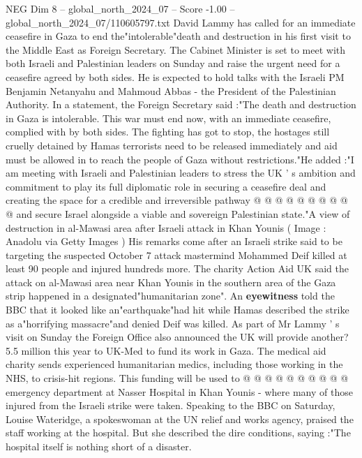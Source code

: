 \begin{textsample}{NEG Dim 8 – global\_north\_2024\_07 – Score -1.00 – global\_north\_2024\_07/110605797.txt}  \label{ex:f8_neg_409}
David Lammy has called for an immediate ceasefire in Gaza to end the"intolerable"death and destruction in his first visit to the Middle East as Foreign Secretary.
The Cabinet Minister is set to meet with both Israeli and Palestinian leaders on Sunday and raise the urgent need for a ceasefire agreed by both sides.
He is expected to hold talks with the Israeli PM Benjamin Netanyahu and Mahmoud Abbas - the President of the Palestinian Authority.
In a statement, the Foreign Secretary said :"The death and destruction in Gaza is intolerable.
This war must end now, with an immediate ceasefire, complied with by both sides.
The fighting has got to stop, the hostages still cruelly detained by Hamas terrorists need to be released immediately and aid must be allowed in to reach the people of Gaza without restrictions."He added :"I am meeting with Israeli and Palestinian leaders to stress the UK ' s ambition and commitment to play its full diplomatic role in securing a ceasefire deal and creating the space for a credible and irreversible pathway @ @ @ @ @ @ @ @ @ @ and secure Israel alongside a viable and sovereign Palestinian state."A view of destruction in al-Mawasi area after Israeli attack in Khan Younis ( Image : Anadolu via Getty Images ) His remarks come after an Israeli strike said to be targeting the suspected October 7 attack mastermind Mohammed Deif killed at least 90 people and injured hundreds more.
The charity Action Aid UK said the attack on al-Mawasi area near Khan Younis in the southern area of the Gaza strip happened in a designated"humanitarian zone".
An \textbf{eyewitness} told the BBC that it looked like an"earthquake"had hit while Hamas described the strike as a"horrifying massacre"and denied Deif was killed.
As part of Mr Lammy ' s visit on Sunday the Foreign Office also announced the UK will provide another? 5.5 million this year to UK-Med to fund its work in Gaza.
The medical aid charity sends experienced humanitarian medics, including those working in the NHS, to crisis-hit regions.
This funding will be used to @ @ @ @ @ @ @ @ @ @ emergency department at Nasser Hospital in Khan Younis - where many of those injured from the Israeli strike were taken.
Speaking to the BBC on Saturday, Louise Wateridge, a spokeswoman at the UN relief and works agency, praised the staff working at the hospital.
But she described the dire conditions, saying :"The hospital itself is nothing short of a disaster.

\end{textsample}
